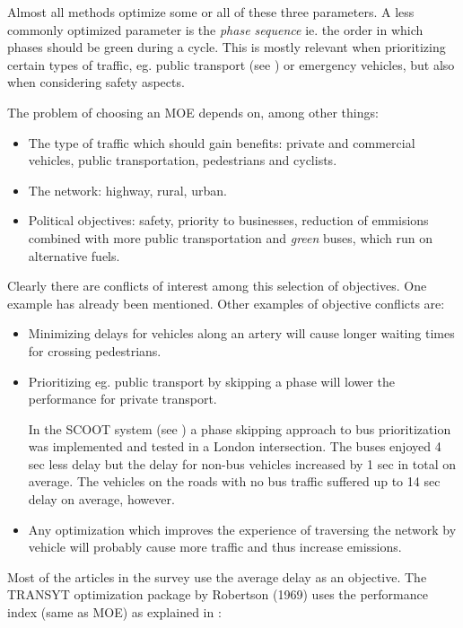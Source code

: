 Almost all methods optimize some or all of these three parameters. A
less commonly optimized parameter is the \textit{phase sequence}
ie. the order in which phases should be green during a cycle. This is
mostly relevant when prioritizing certain types of traffic, eg. public
transport (see \citet{scoot2004}) or emergency vehicles, but also when
considering safety aspects.

The problem of choosing an MOE depends on, among other things:

\begin{itemize}
\item The type of traffic which should gain benefits: private and commercial vehicles, public transportation, pedestrians and cyclists.
\item The network: highway, rural, urban.
\item Political objectives: safety, priority to businesses, reduction of emmisions combined with more public transportation and \textit{green} buses, which run on alternative fuels.
\end{itemize}

Clearly there are conflicts of interest among this selection of
objectives. One example has already been mentioned. Other examples of
objective conflicts are:

\begin{itemize}
\item Minimizing delays for vehicles along an artery will cause longer waiting times for crossing pedestrians.
\item Prioritizing eg. public transport by skipping a phase will lower the performance for private transport. 

In the SCOOT system (see \citet{scoot2004}) a phase skipping approach
to bus prioritization was implemented and tested in a London
intersection. The buses enjoyed 4 sec less delay but the delay for
non-bus vehicles increased by 1 sec in total on average. The vehicles
on the roads with no bus traffic suffered up to 14 sec delay on
average, however.

\item Any optimization which improves the experience of traversing the network by vehicle will probably cause more traffic and thus increase emissions.

\end{itemize}

Most of the articles in the survey use the average delay as an
objective. The TRANSYT optimization package by Robertson (1969) uses
the performance index (same as MOE) as explained in \citet{26}:

